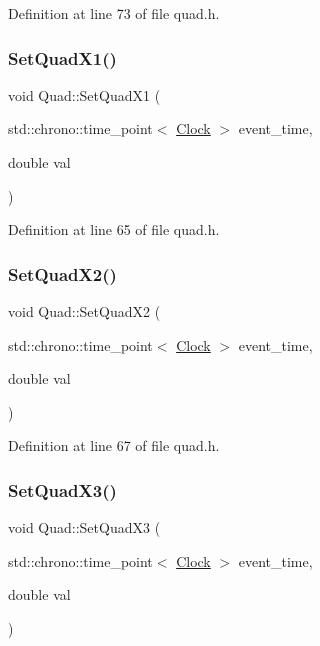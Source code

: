 Definition at line 73 of file quad.\+h.

\mbox{\label{class_quad_a05fb7c22bfef542b99d04f968b4e18ab}} 
\subsubsection{\texorpdfstring{Set\+Quad\+X1()}{SetQuadX1()}}
{\footnotesize\ttfamily void Quad\+::\+Set\+Quad\+X1 (\begin{DoxyParamCaption}\item[{std\+::chrono\+::time\+\_\+point$<$ \hyperlink{universe_8h_a0ef8d951d1ca5ab3cfaf7ab4c7a6fd80}{Clock} $>$}]{event\+\_\+time,  }\item[{double}]{val }\end{DoxyParamCaption})\hspace{0.3cm}{\ttfamily [inline]}}



Definition at line 65 of file quad.\+h.

\mbox{\label{class_quad_af1df44b73207c3e70b794e889e5225af}} 
\subsubsection{\texorpdfstring{Set\+Quad\+X2()}{SetQuadX2()}}
{\footnotesize\ttfamily void Quad\+::\+Set\+Quad\+X2 (\begin{DoxyParamCaption}\item[{std\+::chrono\+::time\+\_\+point$<$ \hyperlink{universe_8h_a0ef8d951d1ca5ab3cfaf7ab4c7a6fd80}{Clock} $>$}]{event\+\_\+time,  }\item[{double}]{val }\end{DoxyParamCaption})\hspace{0.3cm}{\ttfamily [inline]}}



Definition at line 67 of file quad.\+h.

\mbox{\label{class_quad_a0cbdd18a95fe7240b09c40fcee29f5df}} 
\subsubsection{\texorpdfstring{Set\+Quad\+X3()}{SetQuadX3()}}
{\footnotesize\ttfamily void Quad\+::\+Set\+Quad\+X3 (\begin{DoxyParamCaption}\item[{std\+::chrono\+::time\+\_\+point$<$ \hyperlink{universe_8h_a0ef8d951d1ca5ab3cfaf7ab4c7a6fd80}{Clock} $>$}]{event\+\_\+time,  }\item[{double}]{val }\end{DoxyParamCaption})\hspace{0.3cm}{\ttfamily [inline]}}



